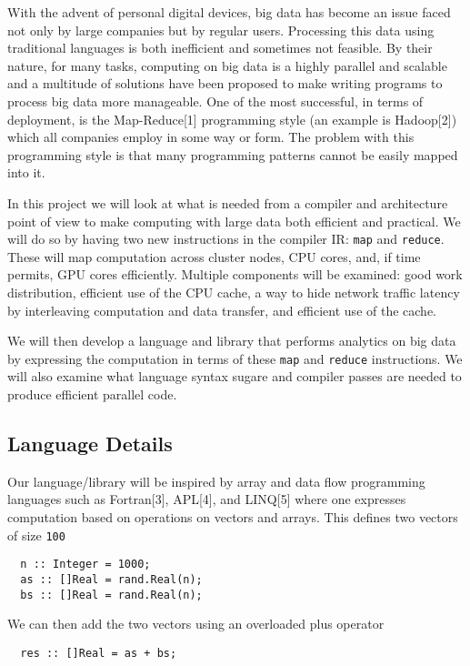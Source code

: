 With the advent of personal digital devices, big data has become an
issue faced not only by large companies but by regular users. Processing
this data using traditional languages is both inefficient and sometimes
not feasible. By their nature, for many tasks, computing on big data is
a highly parallel and scalable and a multitude of solutions have been
proposed to make writing programs to process big data more manageable.
One of the most successful, in terms of deployment, is the
Map-Reduce{[}1{]} programming style (an example is Hadoop{[}2{]}) which
all companies employ in some way or form. The problem with this
programming style is that many programming patterns cannot be easily
mapped into it.

In this project we will look at what is needed from a compiler and
architecture point of view to make computing with large data both
efficient and practical. We will do so by having two new instructions in
the compiler IR: \texttt{map} and \texttt{reduce}. These will map
computation across cluster nodes, CPU cores, and, if time permits, GPU
cores efficiently. Multiple components will be examined: good work
distribution, efficient use of the CPU cache, a way to hide network
traffic latency by interleaving computation and data transfer, and
efficient use of the cache.

We will then develop a language and library that performs analytics on
big data by expressing the computation in terms of these \texttt{map}
and \texttt{reduce} instructions. We will also examine what language
syntax sugare and compiler passes are needed to produce efficient
parallel code.

\subsection{Language Details}\label{language-details}

Our language/library will be inspired by array and data flow programming
languages such as Fortran{[}3{]}, APL{[}4{]}, and LINQ{[}5{]} where one
expresses computation based on operations on vectors and arrays. This
defines two vectors of size \texttt{100}

\begin{verbatim}
  n :: Integer = 1000;
  as :: []Real = rand.Real(n);
  bs :: []Real = rand.Real(n); 
\end{verbatim}

We can then add the two vectors using an overloaded plus operator

\begin{verbatim}
  res :: []Real = as + bs;
\end{verbatim}

